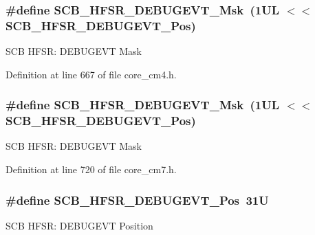 \subsubsection[{\texorpdfstring{S\+C\+B\+\_\+\+H\+F\+S\+R\+\_\+\+D\+E\+B\+U\+G\+E\+V\+T\+\_\+\+Msk}{SCB_HFSR_DEBUGEVT_Msk}}]{\setlength{\rightskip}{0pt plus 5cm}\#define S\+C\+B\+\_\+\+H\+F\+S\+R\+\_\+\+D\+E\+B\+U\+G\+E\+V\+T\+\_\+\+Msk~(1\+U\+L $<$$<$ S\+C\+B\+\_\+\+H\+F\+S\+R\+\_\+\+D\+E\+B\+U\+G\+E\+V\+T\+\_\+\+Pos)}\hypertarget{group___c_m_s_i_s___s_c_b_gababd60e94756bb33929d5e6f25d8dba3}{}\label{group___c_m_s_i_s___s_c_b_gababd60e94756bb33929d5e6f25d8dba3}
S\+CB H\+F\+SR\+: D\+E\+B\+U\+G\+E\+VT Mask 

Definition at line 667 of file core\+\_\+cm4.\+h.

\subsubsection[{\texorpdfstring{S\+C\+B\+\_\+\+H\+F\+S\+R\+\_\+\+D\+E\+B\+U\+G\+E\+V\+T\+\_\+\+Msk}{SCB_HFSR_DEBUGEVT_Msk}}]{\setlength{\rightskip}{0pt plus 5cm}\#define S\+C\+B\+\_\+\+H\+F\+S\+R\+\_\+\+D\+E\+B\+U\+G\+E\+V\+T\+\_\+\+Msk~(1\+U\+L $<$$<$ S\+C\+B\+\_\+\+H\+F\+S\+R\+\_\+\+D\+E\+B\+U\+G\+E\+V\+T\+\_\+\+Pos)}\hypertarget{group___c_m_s_i_s___s_c_b_gababd60e94756bb33929d5e6f25d8dba3}{}\label{group___c_m_s_i_s___s_c_b_gababd60e94756bb33929d5e6f25d8dba3}
S\+CB H\+F\+SR\+: D\+E\+B\+U\+G\+E\+VT Mask 

Definition at line 720 of file core\+\_\+cm7.\+h.

\subsubsection[{\texorpdfstring{S\+C\+B\+\_\+\+H\+F\+S\+R\+\_\+\+D\+E\+B\+U\+G\+E\+V\+T\+\_\+\+Pos}{SCB_HFSR_DEBUGEVT_Pos}}]{\setlength{\rightskip}{0pt plus 5cm}\#define S\+C\+B\+\_\+\+H\+F\+S\+R\+\_\+\+D\+E\+B\+U\+G\+E\+V\+T\+\_\+\+Pos~31U}\hypertarget{group___c_m_s_i_s___s_c_b_ga300c90cfb7b35c82b4d44ad16c757ffb}{}\label{group___c_m_s_i_s___s_c_b_ga300c90cfb7b35c82b4d44ad16c757ffb}
S\+CB H\+F\+SR\+: D\+E\+B\+U\+G\+E\+VT Position 

